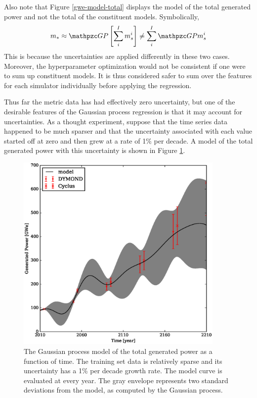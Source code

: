 \clearpage

Also note that Figure \ref{gwe-model-total} displays the model of the total 
generated power and not the total of the constituent models. Symbolically, 
\begin{equation}
\label{total-model}
m_* \approx \GP \left[\sum_i^I m_s^i\right] \ne \sum_i^I \GP m_s^i
\end{equation}
This is because the uncertainties are applied differently in these two cases. 
Moreover, the hyperparameter
optimization would not be consistent if one were to sum up constituent 
models. It is thus considered safer
to sum over the features for each simulator individually before applying the 
regression.

Thus far the metric data has had effectively zero uncertainty, but one of the 
desirable features of the Gaussian process regression is that it may account
for uncertainties. As a thought experiment, suppose that the time 
series data happened to be much sparser and that 
the uncertainty associated with each value started off at zero and then grew at 
a rate of 1\% per decade. A model of the total generated power with this uncertainty 
is shown in Figure \ref{gwe-model-total-with-uncertainty}.

\begin{figure}[htb]
\centering
\includegraphics[width=0.9\textwidth]{gwe-model-total-with-uncertainty.eps}
\caption{The Gaussian process model of the total generated power
as a function of time. The training set data is relatively sparse and its uncertainty
has a 1\% per decade growth rate. The model curve is evaluated at every year. The 
gray envelope represents two standard deviations from the model, as computed by 
the Gaussian process.}
\label{gwe-model-total-with-uncertainty}
\end{figure}

